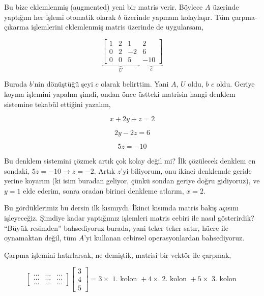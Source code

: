 \documentclass[12pt,fleqn]{article}\usepackage{../../common}
\begin{document}
Bu bize eklemlenmiş (augmented) yeni bir matris verir. Böylece $A$
üzerinde yaptığım her işlemi otomatik olarak $b$ üzerinde yapmam
kolaylaşır. Tüm çarpma-çıkarma işlemlerini eklemlenmiş matris üzerinde de
uygularsam,

$$ 
\underbrace{
\left[\begin{array}{rrr}
1 & 2 & 1 \\
0 & 2 & -2 \\
0 & 0 & 5  
\end{array}\right.}_{U}
\underbrace{
\left. \begin{array}{r}
 2\\
 6\\
 -10 
\end{array}\right]}_{c}
 $$

Burada $b$'nin dönüştüğü şeyi $c$ olarak belirttim. Yani $A$, $U$ oldu,
$b$ $c$ oldu. Geriye koyma işlemini yapalım şimdi, ondan önce üstteki
matrisin hangi denklem sistemine tekabül ettiğini yazalım,

$$ x + 2y + z = 2 $$

$$ 2y -2z = 6 $$

$$ 5z = -10 $$

Bu denklem sistemini çözmek artık çok kolay değil mi? İlk çözülecek denklem
en sondaki, $5z = -10 \rightarrow z = -2$. Artık $z$'yi biliyorum, onu
ikinci denklemde geride yerine koyarım (ki isim buradan geliyor, çünkü
sondan geriye doğru gidiyoruz), ve $y = 1$ elde ederim, sonra oradan
birinci denkleme atlarım, $x = 2$. 

Bu gördüklerimiz bu dersin ilk kısmıydı. İkinci kısımda  matris bakış
açısını işleyeceğiz. Şimdiye kadar yaptığımız işlemleri matris cebiri ile
nasıl gösterirdik? ``Büyük resimden'' bahsediyoruz burada, yani teker teker
satır, hücre ile oynamaktan değil, tüm $A$'yi kullanan cebirsel
operasyonlardan bahsediyoruz. 

Çarpma işlemini hatırlarsak, ne demiştik, matrisi bir vektör ile çarpmak,

$$ 
\left[\begin{array}{rrr}
    \dots & \dots & \dots \\
    \dots &  \dots & \dots \\
    \dots & \dots &  \dots
  \end{array}\right]
\left[\begin{array}{r}
3 \\
4 \\
5
\end{array}\right] = 
3 \times \textrm{ 1. kolon } + 4  \times \textrm{ 2. kolon } + 
5  \times \textrm{ 3. kolon } 
$$
\end{document}
